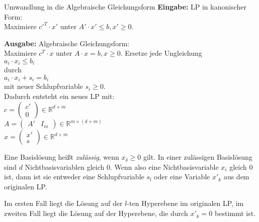 \documentclass{panikzettel}
\begin{document}
\begin{halfboxr}
\vspace{-\baselineskip}
\begin{algo}{Umwandlung in die Algebraische Gleichungsform}
\textbf{Eingabe:} LP in kanonischer Form: \\
\-\hspace{1em} Maximiere ${c'}^T \cdot x'$ unter {\footnotesize $A' \cdot x' \leq b, x' \geq 0$}.

\textbf{Ausgabe:} Algebraische Gleichungsform: \\
\-\hspace{1em} Maximiere $c^T \cdot x$ unter $A \cdot x = b, x \geq 0$.
\tcblower
Ersetze jede Ungleichung \\
\-\hspace{1em} $a_i \cdot x_i \leq b_i$ \\
durch \\
\-\hspace{1em} $a_i \cdot x_i + s_i = b_i$ \\
mit neuer Schlupfvariable $s_i \geq 0$. \\
Dadurch entsteht ein neues LP mit: \\
\-\hspace{1em} $c= \begin{pmatrix} c' \\ 0 \end{pmatrix} \in \mathbb{R}^{d+m}$ \\
\-\hspace{1em} $A = \begin{pmatrix} A' & I_m \end{pmatrix} \in \mathbb{R}^{m \times (d+m)}$ \\
\-\hspace{1em} $x = \begin{pmatrix} x' \\ s \end{pmatrix} \in \mathbb{R}^{d+m}$
\end{algo}
\end{halfboxr}

Eine Basislösung heißt \emph{zulässig}, wenn $x_{\delta} \geq 0$ gilt.
In einer zulässigen Basislösung sind $d$ Nichtbasisvariablen gleich $0$. Wenn also eine Nichtbasisvariable $x_i$ gleich $0$ ist, dann ist sie entweder eine Schlupfvariable $s_l$ oder eine Variable $x'_k$ aus dem originalen LP.

Im ersten Fall liegt die Lösung auf der $l$-ten Hyperebene im originalen LP, im zweiten Fall liegt die Lösung auf der Hyperebene, die durch $x'_k = 0$ bestimmt ist.
\end{document}
